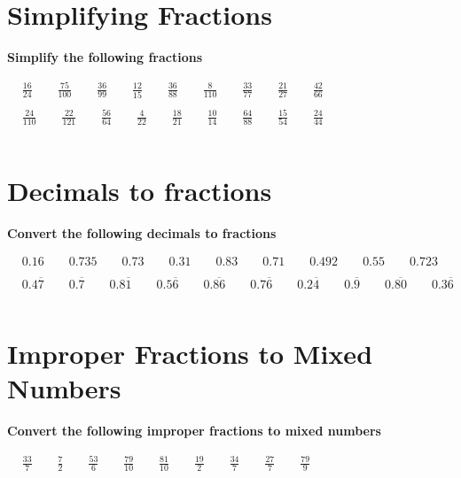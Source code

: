 \documentclass{article}
\begin{document}
\section{Simplifying Fractions}
\textbf{Simplify the following fractions}
\bigskip

\(\begin{aligned}
	&\frac{16}{24} \qquad \frac{75}{100} \qquad \frac{36}{99}\qquad \frac{12}{15} \qquad \frac{36}{88} \qquad \frac{8}{110} \qquad \frac{33}{77} \qquad \frac{21}{27} \qquad \frac{42}{66}\\\\
	&\frac{24}{110} \qquad \frac{22}{121} \qquad \frac{56}{64}\qquad \frac{4}{22} \qquad \frac{18}{21} \qquad \frac{10}{14} \qquad \frac{64}{88} \qquad \frac{15}{54} \qquad \frac{24}{44}\\\\
\end{aligned}\)



\section{Decimals to fractions}
\textbf{Convert the following decimals to fractions}
\bigskip

\(\begin{aligned}
	&0.16 \qquad 0.735 \qquad 0.73 \qquad 0.31 \qquad 0.83 \qquad 0.71 \qquad 0.492 \qquad 0.55 \qquad 0.723\\\\
	&0.4\overline{7} \qquad 0.\overline{7} \qquad 0.8\overline{1} \qquad 0.5\overline{6} \qquad 0.\overline{86} \qquad 0.7\overline{6} \qquad 0.2\overline{4} \qquad 0.\overline{9} \qquad 0.\overline{80} \qquad 0.3\overline{6}\\\\
\end{aligned}\)

\section{Improper Fractions to Mixed Numbers}
\textbf{Convert the following improper fractions to mixed numbers}
\bigskip

\(\begin{aligned}
	&\frac{33}{7} \qquad \frac{7}{2} \qquad \frac{53}{6} \qquad \frac{79}{10} \qquad \frac{81}{10} \qquad \frac{19}{2} \qquad \frac{34}{7} \qquad \frac{27}{7} \qquad \frac{79}{9}\\\\
\end{aligned}\)
\end{document}
